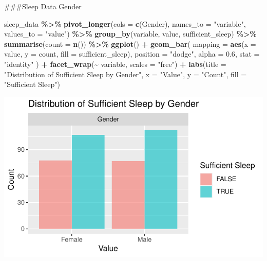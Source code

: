 \documentclass[
  11pt,
]{article}
\newenvironment{Shaded}{\begin{snugshade}}{\end{snugshade}}
\newcommand{\AttributeTok}[1]{\textcolor[rgb]{0.13,0.29,0.53}{#1}}
\newcommand{\FloatTok}[1]{\textcolor[rgb]{0.00,0.00,0.81}{#1}}
\newcommand{\FunctionTok}[1]{\textcolor[rgb]{0.13,0.29,0.53}{\textbf{#1}}}
\newcommand{\NormalTok}[1]{#1}
\newcommand{\SpecialCharTok}[1]{\textcolor[rgb]{0.81,0.36,0.00}{\textbf{#1}}}
\newcommand{\StringTok}[1]{\textcolor[rgb]{0.31,0.60,0.02}{#1}}
\begin{document}
\#\#\#Sleep Data Gender

\begin{Shaded}
\begin{Highlighting}[]
\NormalTok{sleep\_data }\SpecialCharTok{\%\textgreater{}\%}
  \FunctionTok{pivot\_longer}\NormalTok{(}\AttributeTok{cols =} \FunctionTok{c}\NormalTok{(Gender), }\AttributeTok{names\_to =} \StringTok{"variable"}\NormalTok{, }\AttributeTok{values\_to =} \StringTok{"value"}\NormalTok{) }\SpecialCharTok{\%\textgreater{}\%}
  \FunctionTok{group\_by}\NormalTok{(variable, value, sufficient\_sleep) }\SpecialCharTok{\%\textgreater{}\%}
  \FunctionTok{summarise}\NormalTok{(}\AttributeTok{count =} \FunctionTok{n}\NormalTok{()) }\SpecialCharTok{\%\textgreater{}\%}
  \FunctionTok{ggplot}\NormalTok{() }\SpecialCharTok{+}
  \FunctionTok{geom\_bar}\NormalTok{(}
    \AttributeTok{mapping =} \FunctionTok{aes}\NormalTok{(}\AttributeTok{x =}\NormalTok{ value, }\AttributeTok{y =}\NormalTok{ count, }\AttributeTok{fill =}\NormalTok{ sufficient\_sleep),}
    \AttributeTok{position =} \StringTok{"dodge"}\NormalTok{,  }
    \AttributeTok{alpha =} \FloatTok{0.6}\NormalTok{,}
    \AttributeTok{stat =} \StringTok{"identity"}
\NormalTok{  ) }\SpecialCharTok{+}
  \FunctionTok{facet\_wrap}\NormalTok{(}\SpecialCharTok{\textasciitilde{}}\NormalTok{ variable, }\AttributeTok{scales =} \StringTok{"free"}\NormalTok{) }\SpecialCharTok{+}
  \FunctionTok{labs}\NormalTok{(}\AttributeTok{title =} \StringTok{"Distribution of Sufficient Sleep by Gender"}\NormalTok{,}
       \AttributeTok{x =} \StringTok{"Value"}\NormalTok{, }
       \AttributeTok{y =} \StringTok{"Count"}\NormalTok{, }
       \AttributeTok{fill =} \StringTok{"Sufficient Sleep"}\NormalTok{)}
\end{Highlighting}
\end{Shaded}

\begin{center}\includegraphics[width=0.7\linewidth]{SleepHelath_files/figure-latex/unnamed-chunk-19-1} \end{center}
\end{document}
